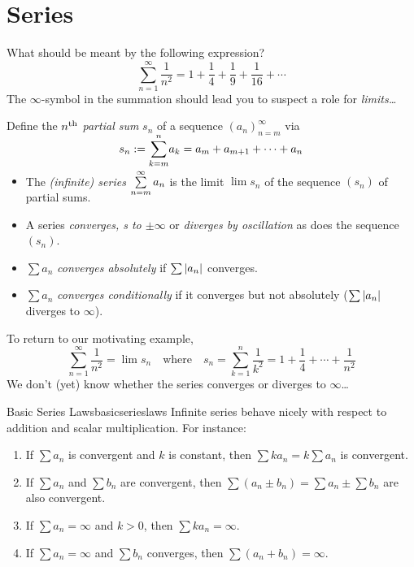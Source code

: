 \graphicspath{{3series/asy/}}

\thispagestyle{empty}

\setcounter{section}{13}
\section{Series}\label{sec:series}


What should be meant by the following expression?
\[\sum_{n=1}^\infty \frac 1{n^2}=1+\frac 14+\frac 19+\frac 1{16}+\cdots\]
The \emph{$\infty$}-symbol in the summation should lead you to suspect a role for \emph{limits\ldots}

\begin{defn}{}{}
	Define the \emph{$n\textsuperscript{th}$ partial sum} $s_n$ of a sequence $(a_n)_{n=m}^\infty$ via
	\[s_n:=\smash{\sum_{k=m}^n}a_k=a_m+a_{m+1}+\cdots+a_n\]
	\begin{itemize}
	  \item The \emph{(infinite) series}\footnotemark{} $\smash[b]{\sum\limits_{n=m}^\infty a_n}$ is the limit $\lim s_n$ of the sequence $(s_n)$ of partial sums.
	  \item A series \emph{converges, s to $\pm\infty$} or \emph{diverges by oscillation} as does the sequence $(s_n)$.
	  \item $\sum a_n$ \emph{converges absolutely} if $\sum\left| a_n\right|$ converges.
	  \item $\sum a_n$ \emph{converges conditionally} if it converges but not absolutely ($\sum \left| a_n\right|$ diverges to $\infty$).
	\end{itemize}
\end{defn}


To return to our motivating example,
\[
	\sum_{n=1}^\infty \frac 1{n^2}=\lim s_n\quad\text{where}\quad s_n=\sum\limits_{k=1}^n \frac 1{k^2}=1+\frac 14+\cdots+\frac 1{n^2}
\]
We don't (yet) know whether the series converges or diverges to $\infty$\ldots

\begin{thm}{Basic Series Laws}{basicserieslaws}
	Infinite series behave nicely with respect to addition and scalar multiplication. For instance:
	\begin{enumerate}
	  \item If $\sum a_n$ is convergent and $k$ is constant, then $\sum ka_n=k\sum a_n$ is convergent.
	  \item If $\sum a_n$ and $\sum b_n$ are convergent, then $\sum(a_n\pm b_n)=\sum a_n\pm\sum b_n$ are also convergent.
	  \item If $\sum a_n=\infty$ and $k>0$, then $\sum ka_n=\infty$.
	  \item If $\sum a_n=\infty$ and $\sum b_n$ converges, then $\sum(a_n+b_n)=\infty$.
	\end{enumerate}
\end{thm}

